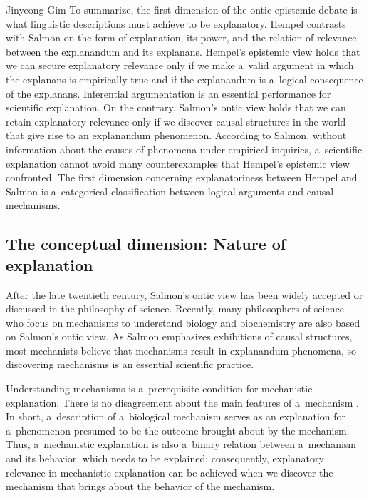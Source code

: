 \begin{artengenv}{Jinyeong Gim}
To summarize, the first dimension of the ontic-epistemic debate is what linguistic descriptions must achieve to be explanatory. Hempel contrasts with Salmon on the form of explanation, its power, and the relation of relevance between the explanandum and its explanans. Hempel's epistemic view holds that we can secure explanatory relevance only if we make a~valid argument in which the explanans is empirically true and if the explanandum is a~logical consequence of the explanans. Inferential argumentation is an essential performance for scientific explanation. On the contrary, Salmon's ontic view holds that we can retain explanatory relevance only if we discover causal structures in the world that give rise to an explanandum phenomenon. According to Salmon, without information about the causes of phenomena under empirical inquiries, a~scientific explanation cannot avoid many counterexamples that Hempel's epistemic view confronted. The first dimension concerning explanatoriness between Hempel and Salmon is a~categorical classification between logical arguments and causal mechanisms.

\subsection{The conceptual dimension: Nature of explanation}

After the late twentieth century, Salmon's ontic view has been widely accepted or discussed in the philosophy of science. Recently, many philosophers of science who focus on mechanisms to understand biology and biochemistry are also based on Salmon's ontic view. As Salmon emphasizes exhibitions of causal structures, most mechanists believe that mechanisms result in explanandum phenomena, so discovering mechanisms is an essential scientific practice.

Understanding mechanisms is a~prerequisite condition for mechanistic explanation. There is no disagreement about the main features of a~mechanism
\parencite[][pp.15–26]{craver_search_2013}. %
 In short, a~description of a~biological mechanism serves as an explanation for a~phenomenon presumed to be the outcome brought about by the mechanism. Thus, a~mechanistic explanation is also a~binary relation between a~mechanism and its behavior, which needs to be explained; consequently, explanatory relevance in mechanistic explanation can be achieved when we discover the mechanism that brings about the behavior of the mechanism.


\end{artengenv}
